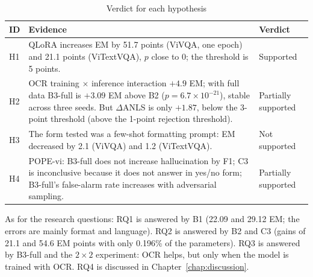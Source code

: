 \begin{table}[htbp]
\caption{Verdict for each hypothesis}
\label{tab:res-hyp}
\centering
\small
\begin{tabular}{p{}p{}p{}}
\toprule
\raggedright \textbf{ID} & \raggedright \textbf{Evidence} & \raggedright \textbf{Verdict} \tabularnewline
\midrule
\raggedright H1 & \raggedright QLoRA increases EM by 51.7 points (ViVQA, one epoch) and 21.1 points (ViTextVQA), $p$ close to 0; the threshold is 5 points. & \raggedright Supported \tabularnewline
\raggedright H2 & \raggedright OCR training $\times$ inference interaction $+4.9$ EM; with full data B3-full is $+3.09$ EM above B2 ($p = 6.7\times10^{-21}$), stable across three seeds. But $\Delta$ANLS is only $+1.87$, below the 3-point threshold (above the 1-point rejection threshold). & \raggedright Partially supported \tabularnewline
\raggedright H3 & \raggedright The form tested was a few-shot formatting prompt: EM decreased by 2.1 (ViVQA) and 1.2 (ViTextVQA). & \raggedright Not supported \tabularnewline
\raggedright H4 & \raggedright POPE-vi: B3-full does not increase hallucination by F1; C3 is inconclusive because it does not answer in yes/no form; B3-full's false-alarm rate increases with adversarial sampling. & \raggedright Partially supported \tabularnewline
\bottomrule
\end{tabular}
\end{table}

As for the research questions: RQ1 is answered by B1 (22.09 and 29.12 EM; the errors are
mainly format and language). RQ2 is answered by B2 and C3 (gains of 21.1 and 54.6 EM points
with only 0.196\% of the parameters). RQ3 is answered by B3-full and the $2\times2$
experiment: OCR helps, but only when the model is trained with OCR. RQ4 is discussed in
Chapter~\ref{chap:discussion}.
